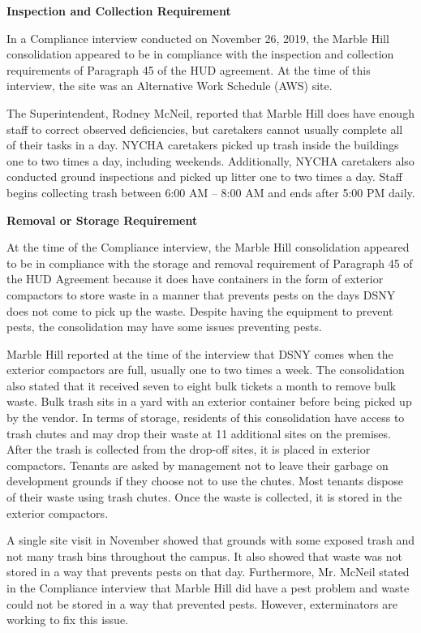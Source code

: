 
\textbf{Inspection and Collection Requirement}

In a Compliance interview conducted on November 26, 2019, the Marble Hill consolidation appeared to be in compliance with the inspection and collection requirements of Paragraph 45 of the HUD agreement. At the time of this interview, the site was an Alternative Work Schedule (AWS) site. 

The Superintendent, Rodney McNeil, reported that Marble Hill does have enough staff to correct observed deficiencies, but caretakers cannot usually complete all of their tasks in a day. NYCHA caretakers picked up trash inside the buildings one to two times a day, including weekends. Additionally, NYCHA caretakers also conducted ground inspections and picked up litter one to two times a day. Staff begins collecting trash between 6:00 AM -- 8:00 AM and ends after 5:00 PM daily.

\textbf{Removal or Storage Requirement}

At the time of the Compliance interview, the Marble Hill consolidation appeared to be in compliance with the storage and removal requirement of Paragraph 45 of the HUD Agreement because it does have containers in the form of exterior compactors to store waste in a manner that prevents pests on the days DSNY does not come to pick up the waste. Despite having the equipment to prevent pests, the consolidation may have some issues preventing pests.  

Marble Hill reported at the time of the interview that DSNY comes when the exterior compactors are full, usually one to two times a week. The consolidation also stated that it received seven to eight bulk tickets a month to remove bulk waste. Bulk trash sits in a yard with an exterior container before being picked up by the vendor. In terms of storage, residents of this consolidation have access to trash chutes and may drop their waste at 11 additional sites on the premises. After the trash is collected from the drop-off sites, it is placed in exterior compactors. Tenants are asked by management not to leave their garbage on development grounds if they choose not to use the chutes. Most tenants dispose of their waste using trash chutes. Once the waste is collected, it is stored in the exterior compactors.  

A single site visit in November showed that grounds with some exposed trash and not many trash bins throughout the campus. It also showed that waste was not stored in a way that prevents pests on that day. Furthermore, Mr. McNeil stated in the Compliance interview that Marble Hill did have a pest problem and waste could not be stored in a way that prevented pests. However, exterminators are working to fix this issue.

